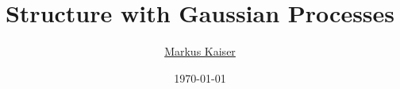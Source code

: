\title{Structure with Gaussian Processes}
\author{\href{mailto:markus@zfix.org}{Markus Kaiser}}
\date{\today}
\newcommand{\acceptdate}{\today}

\renewcommand\maketitle{
}
